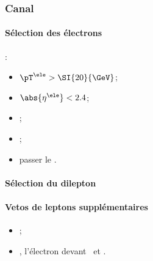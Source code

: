 \subsubsection{Canal \ele\ele}
\paragraph{Sélection des électrons}
:
\begin{itemize}
    \item $\pT^{\ele} > \SI{20}{\GeV}$;
    \item $\abs{\eta^{\ele}} < 2.4$;
    \item \Leptondzdxy;
    \item {};
    \item passer le \NinetyNineEleMVA.
\end{itemize}
\paragraph{Sélection du dilepton}
\AtLeastOneOSPair{\ele\ele}
\IfMoreOnePair
\paragraph{Vetos de leptons supplémentaires}
\LeptonVetoes
\begin{itemize}
    \item \LeptonVetoesExtraMuon;
    \item \LeptonVetoesExtraEleEleEle, l'électron devant \PassConversionVeto\ et \LessTwoMissingHitsVertex.
\end{itemize}
